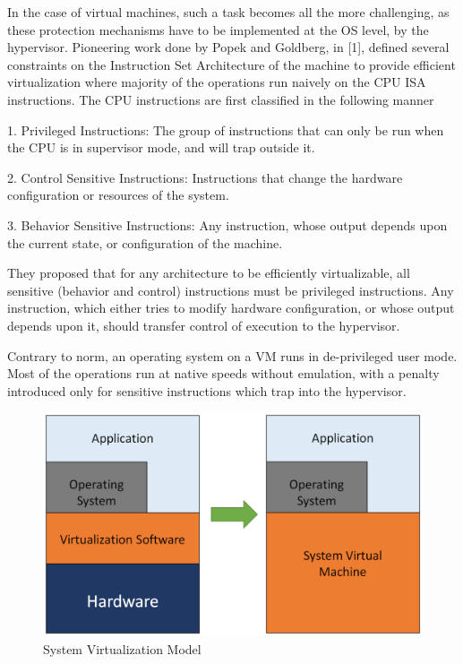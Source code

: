 In the case of virtual machines, such a task becomes all the more challenging, as these protection mechanisms have to be implemented at the OS level, by the hypervisor. Pioneering work done by Popek and Goldberg, in [1], defined several constraints on the Instruction Set Architecture of the machine to provide efficient virtualization where majority of the operations run naively on the CPU ISA instructions. The CPU instructions are first classified in the following manner

1. Privileged Instructions: The group of instructions that can only be run when the CPU is in supervisor mode, and will trap outside it.

2. Control Sensitive Instructions: Instructions that change the hardware configuration or resources of the system.

3. Behavior Sensitive Instructions: Any instruction, whose output depends upon the current state, or configuration of the machine.

They proposed that for any architecture to be efficiently virtualizable, all sensitive (behavior and control) instructions must be privileged instructions. Any instruction, which either tries to modify hardware configuration, or whose output depends upon it, should transfer control of execution to the hypervisor.

Contrary to norm, an operating system on a VM runs in de-privileged user mode. Most of the operations run at native speeds without emulation, with a penalty introduced only for sensitive instructions which trap into the hypervisor. 

\setlength{\belowcaptionskip}{-10pt}

\begin{figure}[H]
  \centering
  \includegraphics[scale=0.6]{figures/sys_virt.png}
  \caption{System Virtualization Model}
  \label{fig:sys_virt}
\end{figure}

